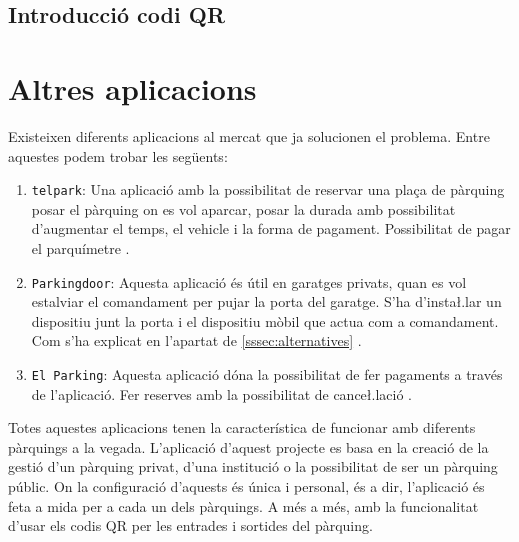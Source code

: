 \newpage
\subsection{Introducció codi QR}


\section{Altres aplicacions}
Existeixen diferents aplicacions al mercat que ja solucionen el problema.
Entre aquestes podem trobar les següents:

\begin{enumerate}
    \item \texttt{telpark}: Una aplicació amb la possibilitat de reservar una plaça de pàrquing posar el pàrquing on es vol
    aparcar, posar la durada amb possibilitat d'augmentar el temps, el vehicle i la forma de pagament.
    Possibilitat de pagar el parquímetre \autocite{telpark}.
    \item \texttt{Parkingdoor}: Aquesta aplicació és útil en garatges privats, quan es vol estalviar el comandament
    per pujar la porta del garatge. S'ha d'insta\l.lar un dispositiu junt la porta i el dispositiu mòbil que actua
    com a comandament. Com s'ha explicat en l'apartat de \autoref{sssec:alternatives} \autocite{parkingdoor}.
    \item \texttt{El Parking}: Aquesta aplicació dóna la possibilitat de fer pagaments a través de l'aplicació.
    Fer reserves amb la possibilitat de cance\l.lació \autocite{el_parking}.
\end{enumerate}

Totes aquestes aplicacions tenen la característica de funcionar amb diferents pàrquings a la vegada.
L'aplicació d'aquest projecte es basa en la creació de la gestió d'un pàrquing privat, d'una institució o la
possibilitat de ser un pàrquing públic. On la configuració d'aquests és única i personal, és a dir, l'aplicació és feta a mida per
a cada un dels pàrquings. A més a més, amb la funcionalitat d'usar els codis QR per les entrades i sortides del pàrquing.
